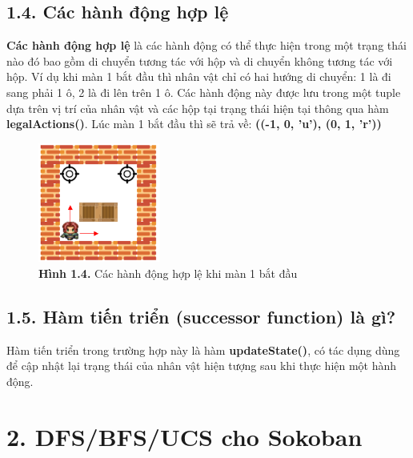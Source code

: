 \documentclass[a4paper,12pt]{article}
\begin{document}
\subsection*{1.4. Các hành động hợp lệ}
\hspace*{7mm}\textbf{Các hành động hợp lệ} là các hành động có thể thực hiện trong một trạng thái nào đó bao gồm di chuyển tương tác với hộp và di chuyển không tương tác với hộp. Ví dụ khi màn 1 bắt đầu thì nhân vật chỉ có hai hướng di chuyển: 1 là đi sang phải 1 ô, 2 là đi lên trên 1 ô. Các hành động này được lưu trong một tuple dựa trên vị trí của nhân vật và các hộp tại trạng thái hiện tại thông qua hàm \textbf{legalActions()}. Lúc màn 1 bắt đầu thì sẽ trả về: \textbf{((-1, 0, 'u'), (0, 1, 'r'))}
\begin{figure}[h]
\centering
\includegraphics[width=4cm]{Level_1_actions.png}
\caption*{\textbf{Hình 1.4.} Các hành động hợp lệ khi màn 1 bắt đầu}
\end{figure}
\subsection*{1.5. Hàm tiến triển (successor function) là gì?}
Hàm tiến triển trong trường hợp này là hàm \textbf{updateState()}, có tác dụng dùng để cập nhật lại trạng thái của nhân vật hiện tượng sau khi thực hiện một hành động.
\newpage
\section*{2. DFS/BFS/UCS cho Sokoban}
\end{document}
